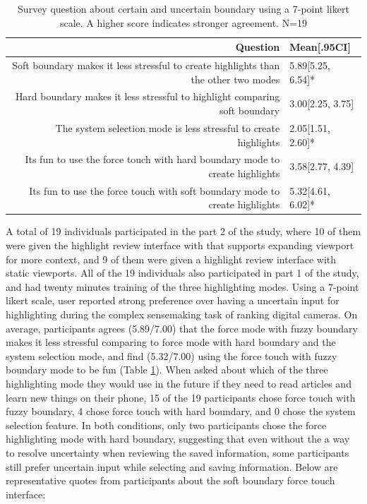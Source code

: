 \begin{table}
    \centering
    \footnotesize
    \begin{tabular}{r | l}
    \hline
    \textbf{Question} & \textbf{Mean[.95CI]} \\
    \hline
Soft boundary makes it less stressful to create highlights than the other two modes & 5.89[5.25, 6.54]* \\
Hard boundary makes it less stressful to highlight comparing soft boundary & 3.00[2.25, 3.75] \\
The system selection mode is less stressful to create highlights & 2.05[1.51, 2.60]* \\
Its fun to use the force touch with hard boundary mode to create highlights & 3.58[2.77, 4.39] \\
Its fun to use the force touch with soft boundary mode to create highlights & 5.32[4.61, 6.02]*  \\
    \hline
    \end{tabular}
    \caption[Survey question about certain and uncertain boundary.]{Survey question about certain and uncertain boundary using a 7-point likert scale. A higher score indicates stronger agreement. N=19}
    \label{tab:fuzzy_survey}
\end{table}

A total of 19 individuals participated in the part 2 of the study, where 10 of them were given the highlight review interface with that supports expanding viewport for more context, and 9 of them were given a highlight review interface with static viewports. All of the 19 individuals also participated in part 1 of the study, and had twenty minutes training of the three highlighting modes.
Using a 7-point likert scale, user reported strong preference over having a uncertain input for highlighting during the complex sensemaking task of ranking digital cameras. On average, participants agrees (5.89/7.00) that the force mode with fuzzy boundary makes it less stressful comparing to force mode with hard boundary and the system selection mode, and find (5.32/7.00) using the force touch with fuzzy boundary mode to be fun (Table \ref{tab:fuzzy_survey}). When asked about which of the three highlighting mode they would use in the future if they need to read articles and learn new things on their phone, 15 of the 19 participants chose force touch with fuzzy boundary, 4 chose force touch with hard boundary, and 0 chose the system selection feature. In both conditions, only two participants chose the force highlighting mode with hard boundary, suggesting that even without the a way to resolve uncertainty when reviewing the saved information, some participants still prefer uncertain input while selecting and saving information. Below are  representative quotes from participants about the soft boundary force touch interface:

